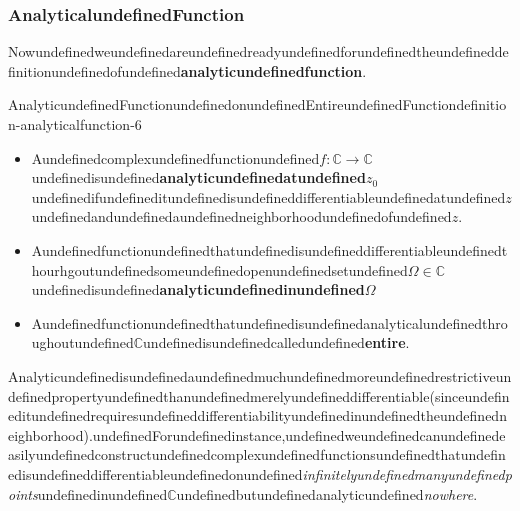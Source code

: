 \subsubsection{AnalyticalundefinedFunction}

Nowundefinedweundefinedareundefinedreadyundefinedforundefinedtheundefineddefinitionundefinedofundefined\textbf{analyticundefinedfunction}.

\begin{mystthmdefinition}{AnalyticundefinedFunctionundefinedonundefinedEntireundefinedFunction}{definition-analyticalfunction-6}\begin{itemize}
\item Aundefinedcomplexundefinedfunctionundefined$f:\mathbb{C} \to \mathbb{C}$undefinedisundefined\textbf{analyticundefinedatundefined$z_0$}undefinedifundefineditundefinedisundefineddifferentiableundefinedatundefined$z$undefinedandundefinedaundefinedneighborhoodundefinedofundefined$z$.
\item Aundefinedfunctionundefinedthatundefinedisundefineddifferentiableundefinedthourhgoutundefinedsomeundefinedopenundefinedsetundefined$\Omega \in \mathbb{C}$undefinedisundefined\textbf{analyticundefinedinundefined$\Omega$}
\item Aundefinedfunctionundefinedthatundefinedisundefinedanalyticalundefinedthroughoutundefined$\mathbb{C}$undefinedisundefinedcalledundefined\textbf{entire}.
\end{itemize}

\end{mystthmdefinition}
Analyticundefinedisundefinedaundefinedmuchundefinedmoreundefinedrestrictiveundefinedpropertyundefinedthanundefinedmerelyundefineddifferentiable(sinceundefineditundefinedrequiresundefineddifferentiabilityundefinedinundefinedtheundefinedneighborhood).undefinedForundefinedinstance,undefinedweundefinedcanundefinedeasilyundefinedconstructundefinedcomplexundefinedfunctionsundefinedthatundefinedisundefineddifferentiableundefinedonundefined\textit{infinitelyundefinedmanyundefinedpoints}undefinedinundefined$\mathbb{C}$undefinedbutundefinedanalyticundefined\textit{nowhere}.

